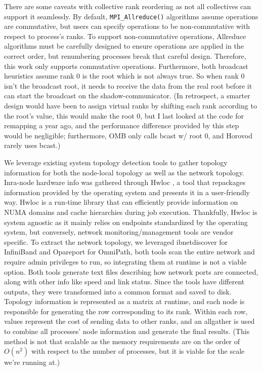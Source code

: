 There are some caveats with collective rank reordering as not all collectives can support it seamlessly.
By default, \texttt{MPI\_Allreduce()} algorithms assume operations are commutative, but users can specify operations to be non-commutative with respect to process's ranks. 
To support non-commutative operations, Allreduce algorithms must be carefully designed to ensure operations are applied in the correct order, but renumbering processes break that careful design.
Therefore, this work only supports commutative operations.
Furthermore, both broadcast heuristics assume rank 0 is the root which is not always true. 
So when rank 0 isn't the broadcast root, it needs to receive the data from the real root before it can start the broadcast on the shadow-communicator.
(In retrospect, a smarter design would have been to assign virtual ranks by shifting each rank according to the root's value, this would make the root 0, but I last looked at the code for remapping a year ago, and the performance difference provided by this step would be negligible; furthermore, OMB only calls bcast w/ root 0, and Horovod rarely uses bcast.)

We leverage existing system topology detection tools to gather topology information for both the node-local topology as well as the network topology.
Inra-node hardware info was gathered through Hwloc \cite{Broquedis2010hwloc}, a tool that repackages information provided by the operating system and presents it in a user-friendly way.
Hwloc is a run-time library that can efficiently provide information on NUMA domains and cache hierarchies during job execution.
Thankfully, Hwloc is system agnostic as it mainly relies on endpoints standardized by the operating system, but conversely, network monitoring/management tools are vendor specific.
To extract the network topology, we leveraged ibnetdiscover for InfiniBand and Opareport for OmniPath, both tools scan the entire network and require admin privileges to run, so integrating them at runtime is not a viable option.
Both tools generate text files describing how network ports are connected, along with other info like speed and link status.
Since the tools have different outputs, they were transformed into a common format and saved to disk.
Topology information is represented as a matrix at runtime, and each node is responsible for generating the row corresponding to its rank.
Within each row, values represent the cost of sending data to other ranks, and an allgather is used to combine all processes' node information and generate the final results.
(This method is not that scalable as the memory requirements are on the order of $O(n^2)$ with respect to the number of processes, but it is viable for the scale we're running at.)

